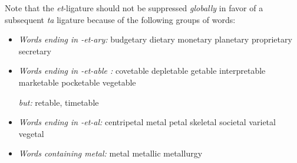 \egroup
\medskip
Note that the \emph{et}-ligature should not be suppressed \emph{globally} in favor of a subsequent \emph{ta} ligature because of the following groups of words:

\bgroup \em
\begin{itemize}
\item \emph{Words ending in -et-ary:} 
budgetary dietary monetary planetary proprietary secretary

\item \emph{Words ending in -et-able :}
covetable depletable getable interpretable marketable pocketable vegetable 

\emph{but:} retable, timetable

\item \emph{Words ending in -et-al:} centripetal 
metal petal skeletal societal varietal vegetal

\item \emph{Words containing metal:} metal metallic metallurgy
\end{itemize}
\egroup
